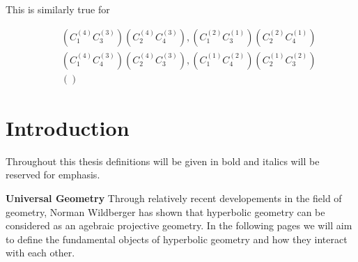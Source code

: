 \documentclass[11pt]{article}
\begin{document}
This is similarly true for 

\begin{eqnarray*}
&&\left( C_{1}^{\left( 4\right) }C_{3}^{\left( 3\right) }\right) \left(
C_{2}^{\left( 4\right) }C_{4}^{\left( 3\right) }\right) ,\left(
C_{1}^{\left( 2\right) }C_{3}^{\left( 1\right) }\right) \left( C_{2}^{\left(
2\right) }C_{4}^{\left( 1\right) }\right)  \\
&&\left( C_{1}^{\left( 4\right) }C_{4}^{\left( 3\right) }\right) \left(
C_{2}^{\left( 4\right) }C_{3}^{\left( 3\right) }\right) ,\left(
C_{1}^{\left( 1\right) }C_{4}^{\left( 2\right) }\right) \left( C_{2}^{\left(
1\right) }C_{3}^{\left( 2\right) }\right)  \\
&&\left( {}\right) 
\end{eqnarray*}

\bigskip \pagebreak 

\section{\protect\bigskip Introduction}

Throughout this thesis definitions will be given in bold and italics will be
reserved for emphasis.\newline

\textbf{Universal Geometry} Through relatively recent developements in the
field of geometry, Norman Wildberger has shown that hyperbolic geometry can
be considered as an agebraic projective geometry. In the following pages we
will aim to define the fundamental objects of hyperbolic geometry and how
they interact with each other.\newline
\end{document}
